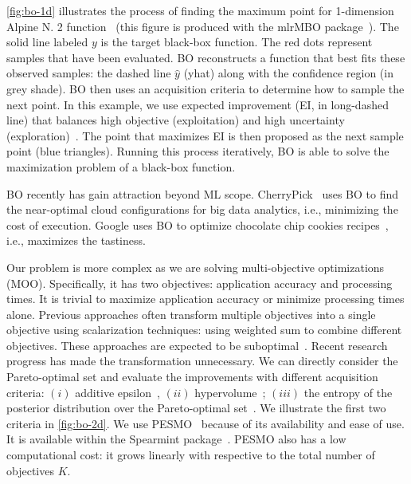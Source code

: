 \autoref{fig:bo-1d} illustrates the process of finding the maximum point for
1-dimension Alpine N. 2 function~\cite{clerc1999swarm} (this figure is produced
with the mlrMBO package~\cite{bischl2017mlrmbo}). The solid line labeled $y$ is
the target black-box function. The red dots represent samples that have been
evaluated. BO reconstructs a function that best fits these observed samples: the
dashed line $\hat{y}$ (yhat) along with the confidence region (in grey shade).
BO then uses an acquisition criteria to determine how to sample the next point.
In this example, we use expected improvement (EI, in long-dashed line) that
balances high objective (exploitation) and high uncertainty
(exploration)~\cite{shahriari2016taking}. The point that maximizes EI is then
proposed as the next sample point (blue triangles). Running this process
iteratively, BO is able to solve the maximization problem of a black-box
function.


BO recently has gain attraction beyond ML scope.
CherryPick~\cite{alipourfard2017cherrypick} uses BO to find the near-optimal
cloud configurations for big data analytics, i.e., minimizing the cost of
execution. Google uses BO to optimize chocolate chip cookies
recipes~\cite{solnik2017bayesian}, i.e., maximizes the tastiness.

Our problem is more complex as we are solving multi-objective optimizations
(MOO). Specifically, it has two objectives: application accuracy and processing
times. It is trivial to maximize application accuracy or minimize processing
times alone. Previous approaches often transform multiple objectives into a
single objective using scalarization techniques: using weighted sum to combine
different objectives. These approaches are expected to be
suboptimal~\cite{knowles2006parego}. Recent research progress has made the
transformation unnecessary. We can directly consider the Pareto-optimal set and
evaluate the improvements with different acquisition criteria: $(i)$ additive
epsilon~\cite{binoisgpareto}, $(ii)$ hypervolume~\cite{binoisgpareto}; $(iii)$
the entropy of the posterior distribution over the Pareto-optimal
set~\cite{hernandez2016predictive}. We illustrate the first two criteria in
\autoref{fig:bo-2d}. We use PESMO~\cite{hernandez2016predictive} because of its
availability and ease of use. It is available within the Spearmint
package~\cite{snoek2016spearmint}.  PESMO also has a low computational cost: it
grows linearly with respective to the total number of objectives $K$.

